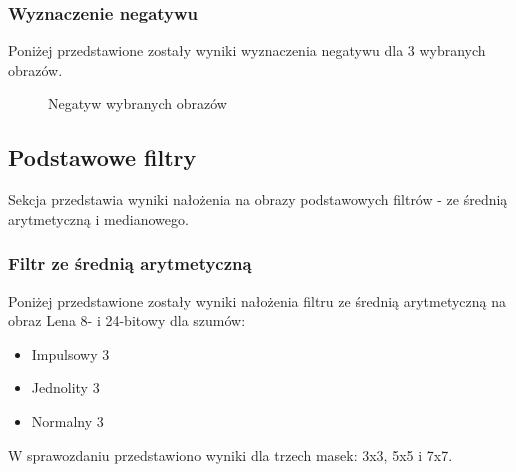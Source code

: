 \documentclass{classrep}
\begin{document}
\subsubsection{Wyznaczenie negatywu}
Poniżej przedstawione zostały wyniki wyznaczenia negatywu dla 3 wybranych obrazów.
\begin{figure}[H]%
    \centering
    \qquad
    \qquad
    \caption{Negatyw wybranych obrazów}%
\end{figure}


\subsection{Podstawowe filtry}
Sekcja przedstawia wyniki nałożenia na obrazy podstawowych filtrów - ze średnią arytmetyczną i medianowego.

\subsubsection{Filtr ze średnią arytmetyczną}
Poniżej przedstawione zostały wyniki nałożenia filtru ze średnią arytmetyczną na obraz Lena 8- i 24-bitowy dla szumów:
\begin{itemize}
\item Impulsowy 3\\
\item Jednolity 3\\
\item Normalny 3\\
\end{itemize}
W sprawozdaniu przedstawiono wyniki dla trzech masek: 3x3, 5x5 i 7x7.
\end{document}
